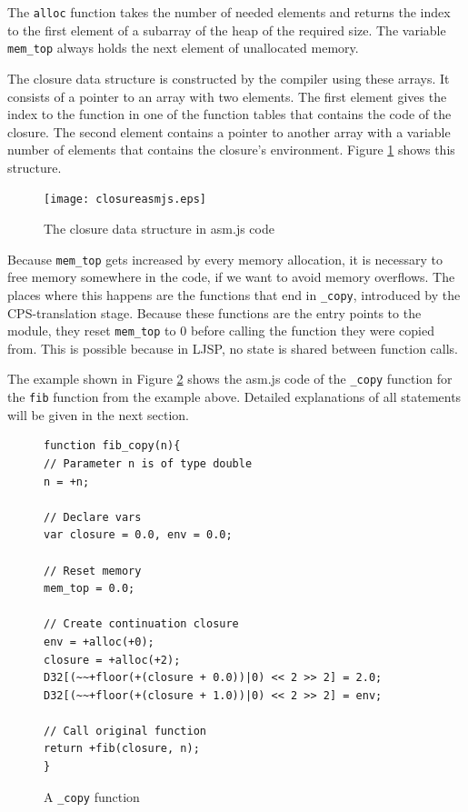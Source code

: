 \documentclass[11pt]{report}
\begin{document}
The \texttt{alloc} function takes the number of needed elements and returns the index to the first element of a subarray of the heap of the required size. The variable \texttt{mem_top} always holds the next element of unallocated memory.

The closure data structure is constructed by the compiler using these arrays. It consists of a pointer to an array with two elements. The first element gives the index to the function in one of the function tables that contains the code of the closure. The second element contains a pointer to another array with a variable number of elements that contains the closure's environment. Figure \ref{asmjsclosure} shows this structure.

\begin{figure}[ht]
\begin{center}
\texttt{[image: closureasmjs.eps]}
\end{center}
\caption{The closure data structure in asm.js code}
\label{asmjsclosure}
\end{figure}


Because \texttt{mem_top} gets increased by every memory allocation, it is necessary to free memory somewhere in the code, if we want to avoid memory overflows. The places where this happens are the functions that end in \texttt{_copy}, introduced by the CPS-translation stage. Because these functions are the entry points to the module, they reset \texttt{mem_top} to $0$ before calling the function they were copied from. This is possible because in LJSP, no state is shared between function calls.

The example shown in Figure \ref{iasmjsmm4} shows the asm.js code of the \texttt{_copy} function for the \texttt{fib} function from the example above. Detailed explanations of all statements will be given in the next section.

\begin{figure}[ht]
\begin{lstlisting}
function fib_copy(n){
// Parameter n is of type double
n = +n;

// Declare vars
var closure = 0.0, env = 0.0;

// Reset memory
mem_top = 0.0;

// Create continuation closure
env = +alloc(+0);
closure = +alloc(+2);
D32[(~~+floor(+(closure + 0.0))|0) << 2 >> 2] = 2.0;
D32[(~~+floor(+(closure + 1.0))|0) << 2 >> 2] = env;

// Call original function
return +fib(closure, n);
}
\end{lstlisting}
\caption{A \texttt{_copy} function}
\label{iasmjsmm4}
\end{figure}
\end{document}
